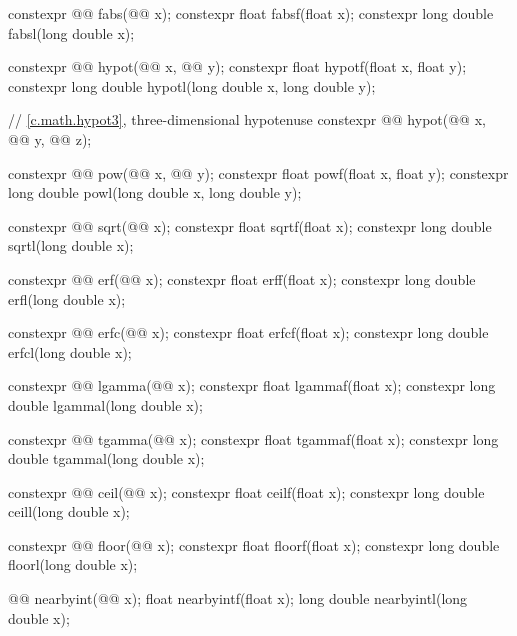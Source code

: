 \begin{codeblock}
{  constexpr @@ fabs(@@ x);
  constexpr float fabsf(float x);
  constexpr long double fabsl(long double x);

  constexpr @@ hypot(@@ x, @@ y);
  constexpr float hypotf(float x, float y);
  constexpr long double hypotl(long double x, long double y);

  // \ref{c.math.hypot3}, three-dimensional hypotenuse
  constexpr @@ hypot(@@ x, @@ y,
                                      @@ z);

  constexpr @@ pow(@@ x, @@ y);
  constexpr float powf(float x, float y);
  constexpr long double powl(long double x, long double y);

  constexpr @@ sqrt(@@ x);
  constexpr float sqrtf(float x);
  constexpr long double sqrtl(long double x);

  constexpr @@ erf(@@ x);
  constexpr float erff(float x);
  constexpr long double erfl(long double x);

  constexpr @@ erfc(@@ x);
  constexpr float erfcf(float x);
  constexpr long double erfcl(long double x);

  constexpr @@ lgamma(@@ x);
  constexpr float lgammaf(float x);
  constexpr long double lgammal(long double x);

  constexpr @@ tgamma(@@ x);
  constexpr float tgammaf(float x);
  constexpr long double tgammal(long double x);

  constexpr @@ ceil(@@ x);
  constexpr float ceilf(float x);
  constexpr long double ceill(long double x);

  constexpr @@ floor(@@ x);
  constexpr float floorf(float x);
  constexpr long double floorl(long double x);

  @@ nearbyint(@@ x);
  float nearbyintf(float x);
  long double nearbyintl(long double x);

}
\end{codeblock}
